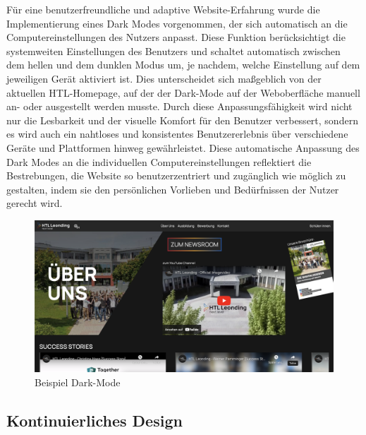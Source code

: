 Für eine benutzerfreundliche und adaptive Website-Erfahrung wurde die Implementierung eines Dark Modes vorgenommen, 
der sich automatisch an die Computereinstellungen des Nutzers anpasst. Diese Funktion berücksichtigt die systemweiten Einstellungen 
des Benutzers und schaltet automatisch zwischen dem hellen und dem dunklen Modus um, je nachdem, welche Einstellung auf dem jeweiligen 
Gerät aktiviert ist. Dies unterscheidet sich maßgeblich von der aktuellen HTL-Homepage, auf der der Dark-Mode auf der Weboberfläche manuell
an- oder ausgestellt werden musste. Durch diese Anpassungsfähigkeit wird nicht nur die Lesbarkeit und der visuelle Komfort für den Benutzer 
verbessert, sondern es wird auch ein nahtloses und konsistentes Benutzererlebnis über verschiedene Geräte und Plattformen hinweg 
gewährleistet. Diese automatische Anpassung des Dark Modes an die individuellen Computereinstellungen reflektiert die Bestrebungen, 
die Website so benutzerzentriert und zugänglich wie möglich zu gestalten, indem sie den persönlichen Vorlieben und Bedürfnissen der
Nutzer gerecht wird.

\begin{figure}
   \begin{minipage}[b]{\linewidth} 
      \includegraphics[scale=0.3]{pics/Example_Darkmode.png}
      \caption{Beispiel Dark-Mode}
      \label{fig:impl:example_darkmode}
   \end{minipage}
   \hspace{.05\linewidth}
\end{figure}


\subsection{Kontinuierliches Design}

